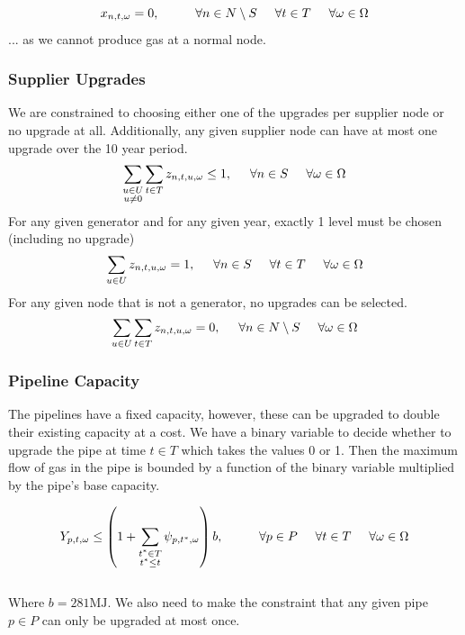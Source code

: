 \documentclass{article}
\begin{document}
\[x_{n,t,\omega} = 0, \hspace{1cm} \forall n\in N \setminus S \hspace{0.5cm} \forall t \in T \hspace{0.5cm} \forall \omega \in \Omega\]
... as we cannot produce gas at a normal node.

\bigskip
\subsubsection{Supplier Upgrades}
We are constrained to choosing either one of the upgrades per supplier node or no upgrade at all. Additionally, any given supplier node can have at most one upgrade over the 10 year period.
\[\sum_{\substack{u\in U \\ u \neq 0}}\sum_{t\in T} z_{n,t,u,\omega} \leq 1, \hspace{0.5cm} \forall n \in S \hspace{0.5cm} \forall \omega \in \Omega\]
\noindent
For any given generator and for any given year, exactly 1 level must be chosen (including no upgrade)
\[\sum_{u\in U} z_{n,t,u,\omega} = 1, \hspace{0.5cm} \forall n \in S \hspace{0.5cm} \forall t \in T \hspace{0.5cm} \forall \omega \in \Omega\]
\noindent
For any given node that is not a generator, no upgrades can be selected.
\[\sum_{u\in U}\sum_{t\in T} z_{n,t,u,\omega} = 0, \hspace{0.5cm} \forall n \in N \setminus S \hspace{0.5cm} \forall \omega \in \Omega\]

\bigskip
\noindent
\subsubsection{Pipeline Capacity}
The pipelines have a fixed capacity, however, these can be upgraded to double their existing capacity at a cost. We have a binary variable to decide whether to upgrade the pipe at time \(t \in T\) which takes the values 0 or 1. Then the maximum flow of gas in the pipe is bounded by a function of the binary variable multiplied by the pipe's base capacity.

\[Y_{p,t,\omega} \leq \left(1 + \sum_{\substack{t^*\in T \\ t^* \leq t}}\psi_{p,t^*,\omega}\right) b, \hspace{1cm} \forall p \in P \hspace{0.5cm} \forall t \in T \hspace{0.5cm} \forall \omega \in \Omega\]
\\
Where \(b = 281 \text{MJ}\).
\smallskip
\noindent 
We also need to make the constraint that any given pipe \(p \in P\) can only be upgraded at most once.
\end{document}
